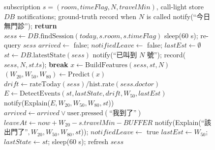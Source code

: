 \documentclass[11pt,twocolumn]{article}
\begin{document}
\begin{figure}[!t]
\linespread{1.0}\selectfont
\begin{minipage}[t]{0.49\textwidth}
\label{alg:agent}
\linespread{1.0}\selectfont\begin{algorithmic}[1]\footnotesize
\REQUIRE subscription $s=(\mathit{room},\mathit{timeFlag},N,\mathit{travelMin})$, call-light store $\mathit{DB}$
\ENSURE notifications; ground-truth record when $N$ is called
 \STATE notify(``今日無門診''); \textbf{return} \ENDIF
\STATE $\mathit{sess} \leftarrow \mathit{DB}.\mathrm{findSession}(\mathit{today}, s.\mathit{room}, s.\mathit{timeFlag})$
 \STATE sleep(60 s); re-query $\mathit{sess}$  \ENDWHILE
\STATE $\mathit{arrived}\leftarrow$ false; $\mathit{notifiedLeave}\leftarrow$ false; $\mathit{lastEst}\leftarrow\emptyset$
  \STATE $st \leftarrow \mathit{DB}.\mathrm{latestState}(\mathit{sess})$ 
    \STATE notify(``已叫到 $N$ 號''); record($\mathit{sess},N,st.ts$); \textbf{break}
  \ENDIF
  \STATE $x \leftarrow \mathrm{BuildFeatures}(\mathit{sess}, st, N)$ 
  \STATE $(W_{20},W_{50},W_{80}) \leftarrow \mathrm{Predict}(x)$
  \STATE $\mathit{drift} \leftarrow \mathrm{rateToday}(\mathit{sess})/\mathrm{hist.rate}(\mathit{sess}.\mathit{doctor})$
  \STATE $E \leftarrow \mathrm{DetectEvents}(st,\mathit{lastState},\mathit{drift},W_{50},\mathit{lastEst})$
  \STATE {}
  \STATE {}
   \STATE notify(Explain($E,W_{20},W_{50},W_{80},st$)) \ENDIF
  \STATE $\mathit{arrived} \leftarrow \mathit{arrived} \lor \mathrm{user.pressed}(\text{``我到了''})$
  \STATE $\mathit{leaveAt} \leftarrow \mathit{now} + W_{20} - s.\mathit{travelMin} - \mathit{BUFFER}$
    \STATE notify(Explain(``該出門了''$,W_{20},W_{50},W_{80},st$)); $\mathit{notifiedLeave}\leftarrow$ true
  \ENDIF
  \STATE $\mathit{lastEst}\leftarrow W_{50}$; $\mathit{lastState}\leftarrow st$; sleep(60 s); refresh $\mathit{sess}$
\ENDWHILE

\end{algorithmic}
\end{minipage}
\end{figure}
\end{document}
